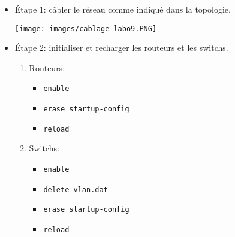 \documentclass[a4paper]{article}
\begin{document}
\begin{itemize}





\item Étape 1: câbler le réseau comme indiqué dans la topologie.
\begin{center}
    \texttt{[image: images/cablage-labo9.PNG]}
\end{center}





\item Étape 2: initialiser et recharger les routeurs et les switchs.
\begin{enumerate}
    \item Routeurs:
    \begin{example}
        \begin{itemize}
            \item \texttt{enable}
            \item \texttt{erase startup-config}
            \item \texttt{reload}
        \end{itemize}
    \end{example}
    \item Switchs:
    \begin{example}
        \begin{itemize}
            \item \texttt{enable}
            \item \texttt{delete vlan.dat}
            \item \texttt{erase startup-config}
            \item \texttt{reload}
        \end{itemize}
    \end{example}
\end{enumerate}






\end{itemize}
\end{document}
